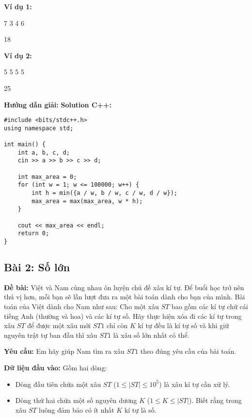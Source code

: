\documentclass[12pt]{scrartcl}  %
\begin{document}
\textbf{Ví dụ 1:}
\begin{tcolorbox}[colback=gray!5!white, colframe=blue!50!black, title=Input]
7 3 4 6
\end{tcolorbox}
\begin{tcolorbox}[colback=gray!5!white, colframe=green!50!black, title=Output]
18
\end{tcolorbox}

\textbf{Ví dụ 2:}
\begin{tcolorbox}[colback=gray!5!white, colframe=blue!50!black, title=Input]
5 5 5 5
\end{tcolorbox}
\begin{tcolorbox}[colback=gray!5!white, colframe=green!50!black, title=Output]
25
\end{tcolorbox}
\textbf{Hướng dẫn giải:}
\textbf{Solution C++:}
\begin{lstlisting}
#include <bits/stdc++.h>
using namespace std;

int main() {
    int a, b, c, d;
    cin >> a >> b >> c >> d;

    int max_area = 0;
    for (int w = 1; w <= 100000; w++) {
        int h = min({a / w, b / w, c / w, d / w});
        max_area = max(max_area, w * h);
    }

    cout << max_area << endl;
    return 0;
}
\end{lstlisting}

\subsection{Bài 2: Số lớn}
\textbf{Đề bài:}
Việt và Nam cùng nhau ôn luyện chủ đề xâu kí tự. Để buổi học trở nên thú vị hơn, mỗi bạn sẽ lần lượt đưa ra một bài toán 
dành cho bạn của mình. Bài toán của Việt dành cho Nam như sau: Cho một xâu $ST$ bao gồm các kí tự chữ cái tiếng Anh (thường và hoa) và 
các kí tự số. Hãy thực hiện xóa đi các kí tự trong xâu $ST$ để được một xâu mới $ST1$ chỉ còn $K$ kí tự đều là kí tự số và khi giữ nguyên trật tự ban đầu 
thì xâu $ST1$ là xâu số lớn nhất có thể.

\textbf{Yêu cầu:}
Em hãy giúp Nam tìm ra xâu $ST1$ theo đúng yêu cầu của bài toán.

\textbf{Dữ liệu đầu vào:}
Gồm hai dòng:
\begin{itemize}
    \item Dòng đầu tiên chứa một xâu $ST$ ($1 \leq |ST| \leq 10^5$) là xâu kí tự cần xử lý.
    \item Dòng thứ hai chứa một số nguyên dương $K$ ($1 \leq K \leq |ST|$). Biết rằng trong xâu $ST$ luông đảm bảo có ít nhất $K$ kí tự là số. 
\end{itemize}
\end{document}
